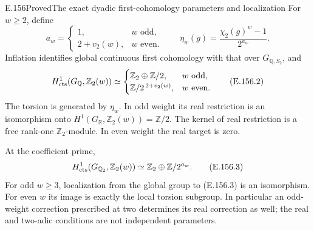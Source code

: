 \begin{result}{E.156}{Proved}{The exact dyadic first-cohomology parameters and localization}
For \(w\geq2\), define
\[
 a_w=
 \begin{cases}
  1,&w\text{ odd},\\
  2+v_2(w),&w\text{ even}.
 \end{cases}
 \qquad
 \eta_w(g)=\frac{\chi_2(g)^w-1}{2^{a_w}}.
 \tag{E.156.1}
\]
Inflation identifies global continuous first cohomology with
that over \(G_{\mathbb Q,S_2}\), and
\[
 H^1_{\rm cts}(G_{\mathbb Q},\mathbb Z_2(w))\simeq
 \begin{cases}
  \mathbb Z_2\oplus\mathbb Z/2,&w\text{ odd},\\
  \mathbb Z/2^{\,2+v_2(w)},&w\text{ even}.
 \end{cases}
 \tag{E.156.2}
\]
The torsion is generated by \(\eta_w\). In odd weight
its real restriction is an isomorphism onto
\(H^1(G_{\mathbb R},\mathbb Z_2(w))=\mathbb Z/2\).
The kernel of real restriction is a free rank-one
\(\mathbb Z_2\)-module. In even weight the real target is zero.

At the coefficient prime,
\[
 H^1_{\rm cts}(G_{\mathbb Q_2},\mathbb Z_2(w))
            \simeq\mathbb Z_2\oplus\mathbb Z/2^{a_w}.
 \tag{E.156.3}
\]
For odd \(w\geq3\), localization from the global group
to (E.156.3) is an isomorphism. For even \(w\) its
image is exactly the local torsion subgroup.
In particular an odd-weight correction prescribed at two
determines its real correction as well; the real and
two-adic conditions are not independent parameters.
\end{result}
